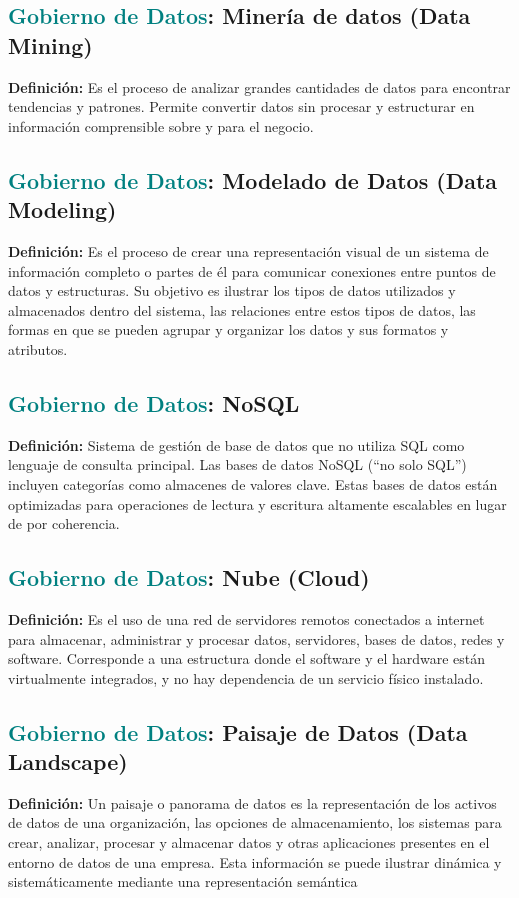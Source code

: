 \documentclass[12pt]{article}
\begin{document}
\subsection{\textcolor{teal}{Gobierno de Datos}: Minería de datos (Data Mining)}
\textbf{Definición:} Es el proceso de analizar grandes cantidades de datos para encontrar tendencias y patrones. Permite convertir datos sin procesar y estructurar en información comprensible sobre y para el negocio.  

\subsection{\textcolor{teal}{Gobierno de Datos}: Modelado de Datos (Data Modeling)}
\textbf{Definición:} Es el proceso de crear una representación visual de un sistema de información completo o partes de él para comunicar conexiones entre puntos de datos y estructuras. Su objetivo es ilustrar los tipos de datos utilizados y almacenados dentro del sistema, las relaciones entre estos tipos de datos, las formas en que se pueden agrupar y organizar los datos y sus formatos y atributos.
\subsection{\textcolor{teal}{Gobierno de Datos}: NoSQL}
\textbf{Definición:} Sistema de gestión de base de datos que no utiliza SQL como lenguaje de consulta principal. Las bases de datos NoSQL (“no solo SQL”) incluyen categorías como almacenes de valores clave. Estas bases de datos están optimizadas para operaciones de lectura y escritura altamente escalables en lugar de por coherencia.
\subsection{\textcolor{teal}{Gobierno de Datos}: Nube (Cloud)}
\textbf{Definición:} Es el uso de una red de servidores remotos conectados a internet para almacenar, administrar y procesar datos, servidores, bases de datos, redes y software. Corresponde a una estructura donde el software y el hardware están virtualmente integrados, y no hay dependencia de un servicio físico instalado.
\subsection{\textcolor{teal}{Gobierno de Datos}: Paisaje de Datos (Data Landscape)}
\textbf{Definición:} Un paisaje o panorama de datos es la representación de los activos de datos de una organización, las opciones de almacenamiento, los sistemas para crear, analizar, procesar y almacenar datos y otras aplicaciones presentes en el entorno de datos de una empresa. Esta información se puede ilustrar dinámica y sistemáticamente mediante una representación semántica
\end{document}
